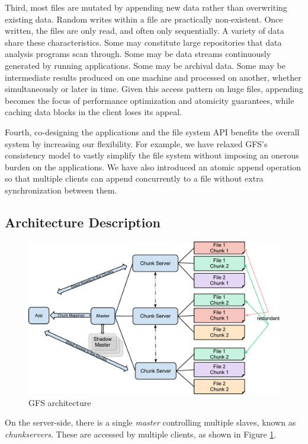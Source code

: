 \documentclass{article}
\begin{document}
Third, most files are mutated by appending new data rather than overwriting existing data. Random writes within a file are practically non-existent. Once written, the files are only read, and often only sequentially. A variety of data share these characteristics. Some may constitute large repositories that data analysis programs scan through. Some may be data streams continuously generated by running applications. Some may be archival data. Some may be intermediate results produced on one machine and processed on another, whether simultaneously or later in time. Given this access pattern on huge files, appending becomes the focus of performance optimization and atomicity guarantees, while caching data blocks in the client loses its appeal.

Fourth, co-designing the applications and the file system API benefits the overall system by increasing our flexibility.  For example, we have relaxed
GFS’s consistency model to vastly simplify the file system without imposing an onerous burden on the applications. We have also introduced an atomic append operation so that multiple clients can append concurrently to a file without extra synchronization between them. 

\subsection{Architecture Description}
\begin{figure}
    \includegraphics[width=\textwidth]{gfs-diagram.pdf}
    \caption{GFS architecture}
    \label{fig:architecture}
\end{figure}

On the server-side, there is a single \emph{master} controlling multiple slaves, known as \emph{chunkservers}. These are accessed by multiple clients, as shown in  Figure \ref{fig:architecture}.
\end{document}
